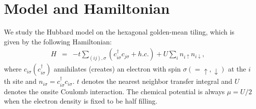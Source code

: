 \documentclass[aps,twocolumn,pra,superscriptaddress,amsmath,amssymb]{revtex4-1}
\begin{document}
\section{Model and Hamiltonian}\label{sec:model}
We study the Hubbard model on the hexagonal golden-mean tiling,
which is given by the following Hamiltonian:
\begin{eqnarray}
  H&=&-t\sum_{(ij),\sigma}\left(c_{i\sigma}^\dag c_{j\sigma}+h.c.\right)
  +U\sum_i n_{i\uparrow}n_{i\downarrow},\label{H}
\end{eqnarray}
where $c_{i\sigma} (c_{i\sigma}^\dag)$ annihilates (creates) an electron
with spin $\sigma(=\uparrow, \downarrow)$ at the $i$th site and
$n_{i\sigma}=c_{i\sigma}^\dag c_{i\sigma}$.
$t$ denotes the nearest neighbor transfer integral
and $U$ denotes the onsite Coulomb interaction.
The chemical potential is always $\mu=U/2$ when the electron
density is fixed to be half filling.
\end{document}
